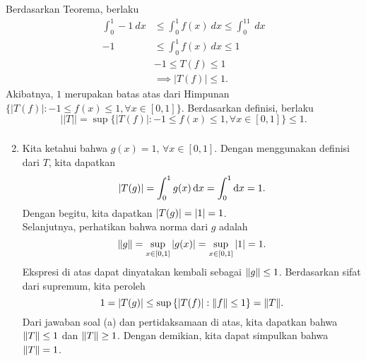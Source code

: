\documentclass[aspectratio=169]{beamer}
\theoremstyle{definition}
\begin{document}
\begin{frame}
  \frametitle{\insertsection}
  \framesubtitle{\insertsubsection}
  Berdasarkan Teorema, berlaku
  \begin{align*}
      \int_0^1-1\ dx&\leq\int_0^1f(x)\ dx\leq\int_0^11\ dx\\
      -1&\leq\int_0^1f(x)\ dx\leq1\\
      &-1\leq T(f)\leq1\\
      &\implies|T(f)|\leq1.
  \end{align*}
  Akibatnya, $1$ merupakan batas atas dari Himpunan $\{|T(f)|:-1\leq f(x)\leq1,\forall x\in [0,1]\}$. Berdasarkan definisi, berlaku
  $$||T||=\sup\{|T(f)|:-1\leq f(x)\leq1,\forall x\in [0,1]\}\leq1.$$
\end{frame}
\begin{frame}
  \frametitle{\insertsection}
  \framesubtitle{\insertsubsection}
  \begin{enumerate}
        \setcounter{enumi}{1}
        \item Kita ketahui bahwa \(g(x) = 1,\,\forall x \in [0,1]\). Dengan menggunakan definisi dari \(T\), kita dapatkan 
        \begin{equation*}
            \abs{T(g)} = \int_0^1g(x)\,\dd x = \int_0^1 \dd x = 1. 
        \end{equation*}
        Dengan begitu, kita dapatkan \(\abs{T(g)} = \abs{1} = 1\). \\
        Selanjutnya, perhatikan bahwa norma dari \(g\) adalah 
        \begin{equation*}
            \norm{g} = \sup_{x\in [0,1]}\abs{g(x)} = \sup_{x\in [0,1]} \abs{1} = 1. 
        \end{equation*}
        Ekspresi di atas dapat dinyatakan kembali sebagai \(\norm{g} \leq 1\). Berdasarkan sifat dari supremum, kita peroleh
        \begin{equation*}
            1 = \abs{T(g)} \leq \sup\qty{\abs{T(f)}:\norm{f}\leq 1} = \norm{T}. 
        \end{equation*}
        Dari jawaban soal (a) dan pertidaksamaan di atas, kita dapatkan bahwa \(\norm{T} \leq 1\) dan \(\norm{T} \geq 1\). Dengan demikian, kita dapat simpulkan bahwa \(\norm{T} = 1\). 
    \end{enumerate}
\end{frame}
\end{document}
